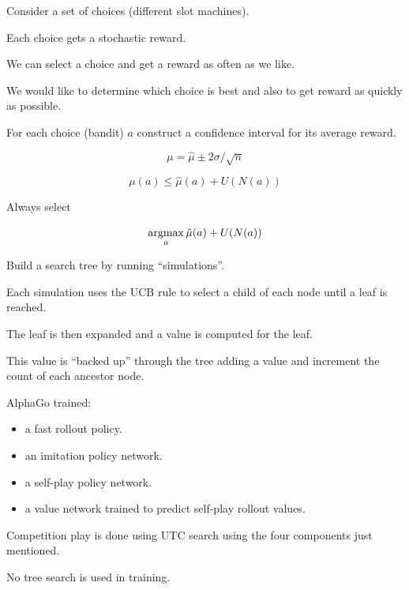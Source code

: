 {Consider a set of choices (different slot machines).

Each choice gets a stochastic reward.

\vfill
We can select a choice and get a reward as often as we like.

\vfill
We would like to determine which choice is best and also to get reward as quickly as possible.


For each choice (bandit) $a$ construct a confidence interval for its average reward.

\vfill
$$\mu = \hat{\mu} \pm 2\sigma/\sqrt{n}$$

\vfill
$$\mu(a) \leq \hat{\mu}(a) + U(N(a))$$

\vfill
Always select

$$\operatorname*{argmax}_a \hat{\mu}(a) + U(N(a))$$


Build a search tree by running ``simulations''.

\vfill
Each simulation uses the UCB rule to select a child of each node until a leaf is reached.

\vfill
The leaf is then expanded and a value is computed for the leaf.

\vfill
This value is ``backed up'' through the tree adding a value and increment the count of each
ancestor node.


AlphaGo trained:

\begin{itemize}
\item a fast rollout policy.

\item an imitation policy network.

\item a self-play policy network.

\item a value network trained to predict self-play rollout values.
\end{itemize}


Competition play is done using UTC search using the four components just mentioned.

\vfill
No tree search is used in training.


}
